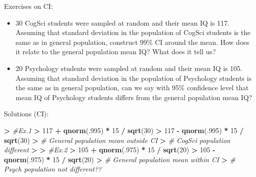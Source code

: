 \documentclass[
  ignorenonframetext,
]{beamer}
\newenvironment{Shaded}{\begin{snugshade}}{\end{snugshade}}
\newcommand{\CommentTok}[1]{\textcolor[rgb]{0.56,0.35,0.01}{\textit{#1}}}
\newcommand{\DecValTok}[1]{\textcolor[rgb]{0.00,0.00,0.81}{#1}}
\newcommand{\ErrorTok}[1]{\textcolor[rgb]{0.64,0.00,0.00}{\textbf{#1}}}
\newcommand{\FunctionTok}[1]{\textcolor[rgb]{0.13,0.29,0.53}{\textbf{#1}}}
\newcommand{\NormalTok}[1]{#1}
\newcommand{\SpecialCharTok}[1]{\textcolor[rgb]{0.81,0.36,0.00}{\textbf{#1}}}
\begin{document}
\begin{frame}{Exercises on CI:}
\label{exercises-on-ci}
\begin{itemize}
\item
  30 CogSci students were sampled at random and their mean IQ is 117.
  Assuming that standard deviation in the population of CogSci students
  is the same as in general population, construct 99\% CI around the
  mean. How does it relate to the general population mean IQ? What does
  it tell us?
\item
  20 Psychology students were sampled at random and their mean IQ is
  105. Assuming that standard deviation in the population of Psychology
  students is the same as in general population, can we say with 95\%
  confidence level that mean IQ of Psychology students differs from the
  general population mean IQ?
\end{itemize}
\end{frame}

\begin{frame}[fragile]{Solutions (CI):}
\label{solutions-ci}
\begin{Shaded}
\begin{Highlighting}[]
\SpecialCharTok{\textgreater{}} \CommentTok{\#Ex.1}
\ErrorTok{\textgreater{}} \DecValTok{117} \SpecialCharTok{+} \FunctionTok{qnorm}\NormalTok{(.}\DecValTok{995}\NormalTok{) }\SpecialCharTok{*} \DecValTok{15} \SpecialCharTok{/} \FunctionTok{sqrt}\NormalTok{(}\DecValTok{30}\NormalTok{)}
\SpecialCharTok{\textgreater{}} \DecValTok{117} \SpecialCharTok{{-}} \FunctionTok{qnorm}\NormalTok{(.}\DecValTok{995}\NormalTok{) }\SpecialCharTok{*} \DecValTok{15} \SpecialCharTok{/} \FunctionTok{sqrt}\NormalTok{(}\DecValTok{30}\NormalTok{)}
\SpecialCharTok{\textgreater{}} \CommentTok{\# General population mean outside CI}
\ErrorTok{\textgreater{}} \CommentTok{\# CogSci population different}
\ErrorTok{\textgreater{}} 
\ErrorTok{\textgreater{}} \CommentTok{\#Ex.2}
\ErrorTok{\textgreater{}} \DecValTok{105} \SpecialCharTok{+} \FunctionTok{qnorm}\NormalTok{(.}\DecValTok{975}\NormalTok{) }\SpecialCharTok{*} \DecValTok{15} \SpecialCharTok{/} \FunctionTok{sqrt}\NormalTok{(}\DecValTok{20}\NormalTok{)}
\SpecialCharTok{\textgreater{}} \DecValTok{105} \SpecialCharTok{{-}} \FunctionTok{qnorm}\NormalTok{(.}\DecValTok{975}\NormalTok{) }\SpecialCharTok{*} \DecValTok{15} \SpecialCharTok{/} \FunctionTok{sqrt}\NormalTok{(}\DecValTok{20}\NormalTok{)}
\SpecialCharTok{\textgreater{}} \CommentTok{\# General population mean within CI}
\ErrorTok{\textgreater{}} \CommentTok{\# Psych population not different??}
\end{Highlighting}
\end{Shaded}
\end{frame}
\end{document}
